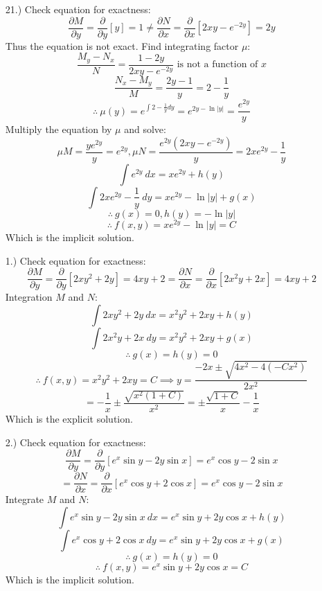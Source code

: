 \documentclass[12pt]{article}
\newcommand{\bracks}[1]{\left[#1\right]}
\newcommand{\pderv}[2]{\dfrac{\partial#1}{\partial#2}}
\begin{document}
\begin{itemize}
    \pagebreak
    \item [21.)] Check equation for exactness:
    \[\pderv{M}{y}=\pderv{}{y}\bracks{y}=1\neq\pderv{N}{x}=\pderv{}{x}\bracks{2xy-e^{-2y}}=2y\]
    Thus the equation is not exact. Find integrating factor $\mu$:
    \[\frac{M_y-N_x}{N}=\frac{1-2y}{2xy-e^{-2y}}\text{ is not a function of }x\]
    \[\frac{N_x-M_y}{M}=\frac{2y-1}{y}=2-\frac{1}{y}\]
    \[\therefore\ \mu(y)=e^{\int2-\frac{1}{y}dy}=e^{2y-\ln\vert y\vert}=\frac{e^{2y}}{y}\]
    Multiply the equation by $\mu$ and solve:
    \[\mu M=\frac{ye^{2y}}{y}=e^{2y},\mu N=\frac{e^{2y}(2xy-e^{-2y})}{y}=2xe^{2y}-\frac{1}{y}\]
    \[\int e^{2y}\ dx=xe^{2y}+h(y)\]
    \[\int2xe^{2y}-\frac{1}{y}\ dy=xe^{2y}-\ln\vert y\vert+g(x)\]
    \[\therefore\ g(x)=0,h(y)=-\ln\vert y\vert\]
    \[\therefore\ f(x,y)=xe^{2y}-\ln\vert y\vert=C\]
    Which is the implicit solution.

    \item [1.)] Check equation for exactness:
    \[\pderv{M}{y}=\pderv{}{y}\bracks{2xy^2+2y}=4xy+2=\pderv{N}{x}=\pderv{}{x}\bracks{2x^2y+2x}=4xy+2\]
    Integration $M$ and $N$:
    \[\int2xy^2+2y\ dx=x^2y^2+2xy+h(y)\]
    \[\int2x^2y+2x\ dy=x^2y^2+2xy+g(x)\]
    \[\therefore\ g(x)=h(y)=0\]
    \[\therefore\ f(x,y)=x^2y^2+2xy=C\implies y=\frac{-2x\pm\sqrt{4x^2-4(-Cx^2)}}{2x^2}\]
    \[=-\frac{1}{x}\pm\frac{\sqrt{x^2(1+C)}}{x^2}=\pm\frac{\sqrt{1+C}}{x}-\frac{1}{x}\]
    Which is the explicit solution.

    \pagebreak
    \item [2.)] Check equation for exactness:
    \[\pderv{M}{y}=\pderv{}{y}\bracks{e^x\sin y-2y\sin x}=e^x\cos y-2\sin x\]
    \[=\pderv{N}{x}=\pderv{}{x}\bracks{e^x\cos y+2\cos x}=e^x\cos y-2\sin x\]
    Integrate $M$ and $N$:
    \[\int e^x\sin y-2y\sin x\ dx=e^x\sin y+2y\cos x+h(y)\]
    \[\int e^x\cos y+2\cos x\ dy=e^x\sin y+2y\cos x+g(x)\]
    \[\therefore\ g(x)=h(y)=0\]
    \[\therefore\ f(x,y)=e^x\sin y+2y\cos x=C\]
    Which is the implicit solution.

\end{itemize}
\end{document}
